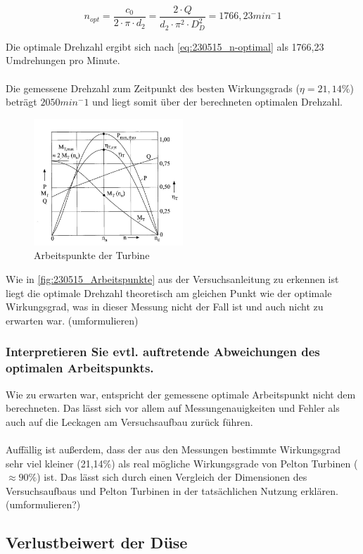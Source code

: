 \begin{equation}
 n_{opt}=\frac{c_{0}}{2 \cdot \pi \cdot d_{2}}=\frac{2 \cdot Q}{d_{2} \cdot \pi^2  \cdot D_{D}^2}=1766,23  min^-1
\label{eq:230515_n-optimal}
\end{equation}


 Die optimale Drehzahl ergibt sich nach \autoref{eq:230515_n-optimal} als 1766,23 Umdrehungen pro Minute.
\\\\
Die gemessene Drehzahl zum Zeitpunkt des besten Wirkungsgrads ($\eta=21,14\%$) beträgt $2050 min^-1$ und liegt somit über der berechneten optimalen Drehzahl. 

\begin{figure}[!ht]
		\centering
		\includegraphics[width=0.5\textwidth]{Abbildungen/Arbeitspunkte}
		\caption{Arbeitspunkte der Turbine}
		\label{fig:230515_Arbeitspunkte}
\end{figure}

Wie in \autoref{fig:230515_Arbeitspunkte} aus der Versuchsanleitung zu erkennen ist liegt die optimale Drehzahl theoretisch am gleichen Punkt wie der optimale Wirkungsgrad, was in dieser Messung nicht der Fall ist und auch nicht zu erwarten war.  (umformulieren) 


\subsubsection{Interpretieren Sie evtl. auftretende Abweichungen des optimalen Arbeitspunkts.}

Wie zu erwarten war, entspricht der gemessene optimale Arbeitspunkt nicht dem berechneten. Das lässt sich vor allem auf Messungenauigkeiten und Fehler als auch auf die Leckagen am Versuchsaufbau zurück führen. \\\\ Auffällig ist außerdem, dass der aus den Messungen bestimmte Wirkungsgrad sehr viel kleiner (21,14\%) als real mögliche Wirkungsgrade von Pelton Turbinen ($\approx90\%$) ist. Das lässt sich durch einen Vergleich der Dimensionen des Versuchsaufbaus und Pelton Turbinen in der tatsächlichen Nutzung erklären. (umformulieren?)


\subsection{Verlustbeiwert der Düse}